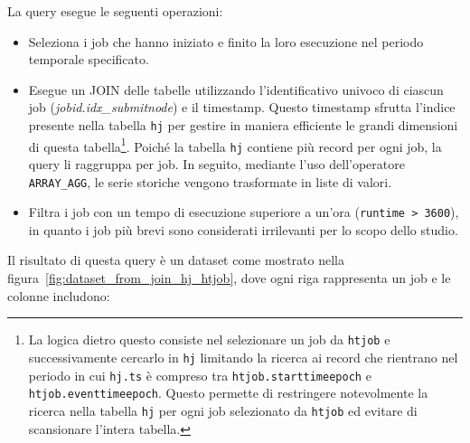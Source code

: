 



La query esegue le seguenti operazioni:
\begin{itemize}
    \item Seleziona i job che hanno iniziato e finito la loro esecuzione nel
        periodo temporale specificato.
    \item Esegue un JOIN delle tabelle utilizzando l'identificativo univoco di
        ciascun job (\textit{jobid.idx\_submitnode}) e il timestamp. Questo
        timestamp sfrutta l'indice presente nella tabella
        \texttt{hj} per gestire in maniera efficiente le grandi dimensioni di
        questa tabella\footnote{La logica dietro questo consiste
            nel selezionare un job da \texttt{htjob} e successivamente
            cercarlo in \texttt{hj} limitando la ricerca ai record che
            rientrano nel periodo in cui \texttt{hj.ts} è compreso tra
            \texttt{htjob.starttimeepoch} e \texttt{htjob.eventtimeepoch}.
            Questo permette di restringere notevolmente la ricerca nella
            tabella \texttt{hj} per ogni job selezionato da \texttt{htjob} ed
        evitare di scansionare l'intera tabella.}. Poiché la tabella \texttt{hj} contiene più record per
        ogni job, la query li raggruppa per job. In seguito, mediante l'uso
        dell'operatore \verb|ARRAY_AGG|, le serie storiche vengono trasformate
        in liste di valori.
    \item Filtra i job con un tempo di esecuzione superiore a un'ora
        (\verb|runtime > 3600|), in quanto i job più brevi sono considerati
        irrilevanti per lo scopo dello studio.
\end{itemize}

Il risultato di questa query è un dataset come mostrato nella
figura~\ref{fig:dataset_from_join_hj_htjob}, dove ogni riga rappresenta un job
e le colonne includono: 

